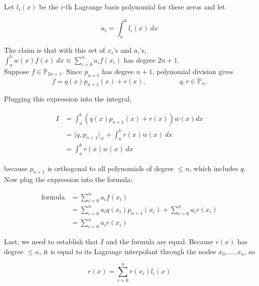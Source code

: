 \documentclass[a4paper,11pt]{report}
\begin{document}
\begin{enumerate}
\begin{itemize}
    Let $l_{i} (x)$ be the $i$-th Lagrange basis polynomial for these zeros and let
    
    \begin{equation*}
    a_{i} = \int_{a}^{b} l_{i} (x)\ dx
    \end{equation*}    

    The claim is that with this set of $x_{i}$'s and $a_{i}$'s, $\displaystyle \int_{a}^{b} w(x) f(x)\ dx \approx \sum_{i=0}^{n} a_{i} f(x_{i})$ has degree $2n+1$. \\

    Suppose $f \in \mathbb{P}_{2n+1}$. Since $p_{n+1}$ has degree $n+1$, polynomial division gives
    \begin{equation*}
    f = q(x)p_{n+1} (x) + r(x), \hspace{2cm} q, r \in \mathbb{P}_{n}.
    \end{equation*}

    Plugging this expression into the integral,

    \begin{equation*}
    \begin{aligned}
    I &= \int_{a}^{b} (q(x)p_{n+1}(x) + r(x)) w(x) dx \\
      &= \langle q, p_{n+1} \rangle_{w} + \int_{a}^{b} r(x) w(x)\ dx \\
      &= \int_{a}^{b} r(x) w(x)\ dx
    \end{aligned}
    \end{equation*}

    because $p_{n+1}$ is orthogonal to all polynomials of degree $\le n$, which includes $q$. Now plug the expression into the formula:

    \begin{equation*}
    \begin{aligned}
    \text{formula} &= \sum_{i=0}^{n} a_{i} f(x_{i}) \\
    &= \sum_{i=0}^{n} a_{i} q(x_{i}) p_{n+1}(x_{i}) + \sum_{i=0}^{n} a_{i} r(x_{i}) \\
    &= \sum_{i=0}^{n} a_{i} r(x_{i})
    \end{aligned}
    \end{equation*}
 
    Last, we need to establish that $I$ and the formula are equal. Because $r(x)$ has degree $\le n$, it is equal to its Lagrange interpolant through the nodes $x_{0},...,x_{n}$, so

    \begin{equation*}
    r(x) = \sum_{i=0}^{n} r(x_{i}) l_{i}(x)
    \end{equation*}


\end{itemize}
\end{enumerate}
\end{document}
